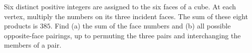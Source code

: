 Six distinct positive integers are assigned to the six faces of a cube. At each vertex, multiply the numbers on its three incident faces. The sum of these eight products is $385$. Find (a) the sum of the face numbers and (b) all possible opposite-face pairings, up to permuting the three pairs and interchanging the members of a pair.
